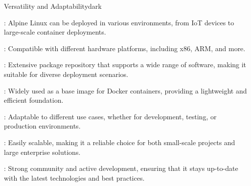 \label{Versatility and Adaptability}
\begin{baseBoxThree}{Versatility and Adaptability}{dark}
    \begin{posnexItemize}
        \item[\sA] : Alpine Linux can be deployed in various environments, from IoT devices to large-scale container deployments.
        \item[\sA] : Compatible with different hardware platforms, including x86, ARM, and more. 
        \item[\sA] : Extensive package repository that supports a wide range of software, making it suitable for diverse deployment scenarios.
        \item[\sA] : Widely used as a base image for Docker containers, providing a lightweight and efficient foundation.
        \item[\sA] : Adaptable to different use cases, whether for development, testing, or production environments.
        \item[\sA] : Easily scalable, making it a reliable choice for both small-scale projects and large enterprise solutions.
        \item[\sA] : Strong community and active development, ensuring that it stays up-to-date with the latest technologies and best practices. 
    \end{posnexItemize}
\end{baseBoxThree}

